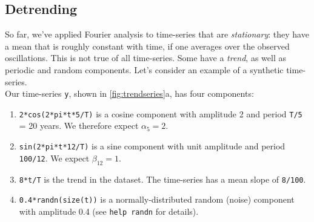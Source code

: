 \documentclass[11pt,twoside,a4paper]{article}
\begin{document}
\subsection{Detrending} 

So far, we've applied Fourier analysis to
time-series that are \textit{stationary}: they have a mean that is
roughly constant with time, if one averages over the observed
oscillations. This is not true of all time-series.  Some have a
\textit{trend}, as well as periodic and random components.  Let's
consider an example of a synthetic time-series.
\\[1mm]
Our time-series \texttt{y}, shown in \autoref{fig:trendseries}a, 
has four components:
\begin{enumerate}
\item \texttt{2*cos(2*pi*t*5/T)} is a cosine component with amplitude 2 and
  period \texttt{T/5} = 20 years.  We therefore expect $\alpha_5=2$.
\item \texttt{sin(2*pi*t*12/T)} is a sine component with unit amplitude
  and period \texttt{100/12}. We expect $\beta_{12}=1$.
\item \texttt{8*t/T} is the trend in the dataset.  The time-series has
  a mean slope of \texttt{8/100}.
\item \texttt{0.4*randn(size(t))} is a normally-distributed random
  (noise) component with amplitude 0.4 (see \texttt{help randn} for
  details). 
\end{enumerate}
\end{document}
